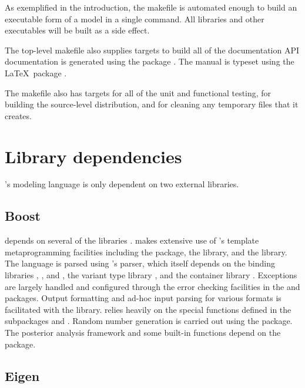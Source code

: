 \documentclass[article]{jss}
\begin{document}
As exemplified in the introduction, the makefile is automated enough
to build an executable form of a  model in a single
command.  All libraries and other executables will be built as a side
effect.  

The top-level makefile also supplies targets to build all of the
documentation  API documentation is generated using the
 package \citep{Doxygen:2011}.  The 
manual \citep{Stan:2013} is typeset using the \LaTeX\ package
\citep{MittelbachEtAl:2004}.

The makefile also has targets for all of the unit and functional
testing, for building the source-level distribution, and for cleaning
any temporary files that it creates.

\section{Library dependencies}\label{libraries.section}

's modeling language is only dependent on two external
libraries.  

\subsection{Boost} 

 depends on several of the  
libraries \citep{Boost:2011}.   makes extensive use of
's template metaprogramming facilities including the
 package, the  library, and the
 library.  The  language is parsed
using 's  parser, which itself depends on
the binding libraries , , and ,
the variant type library , and the container library
.  Exceptions are largely handled and configured through
the error checking facilities in the  and
 packages.  Output formatting and ad-hoc input parsing
for various formats is facilitated with the  library.
 relies heavily on the special functions defined in the
 subpackages  and .  Random number generation is carried out using the
 package.  The posterior analysis framework and some
built-in functions depend on the  package.

\subsection{Eigen}
\end{document}

